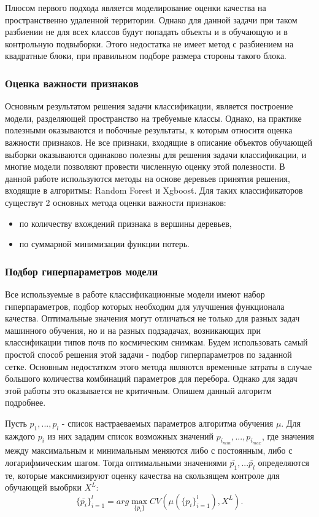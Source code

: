 \documentclass[14pt]{extarticle}
\begin{document}
Плюсом первого подхода является моделирование оценки качества на
пространственно удаленной территории. Однако для данной задачи при таком разбиении
не для всех классов будут попадать объекты и в обучающую и в контрольную подвыборки.
Этого недостатка не имеет метод с разбиением на квадратные блоки, при правильном
подборе размера стороны такого блока.
\par

\subsubsection{Оценка важности признаков}

\par
Основным результатом решения задачи классификации, является построение модели, разделяющей
пространство на требуемые классы. Однако, на практике полезными оказываются и побочные результаты,
к которым относитя оценка важности признаков. Не все признаки, входящие в описание объектов
обучающей выборки оказываются одинаково полезны для решения задачи классификации, и многие
модели позволяют провести численную оценку этой полезности. В данной работе используются методы
на основе деревьев принятия решения, входящие в алгоритмы: Random Forest и Xgboost. 
Для таких классификаторов существут 2 основных метода оценки важности признаков:
\begin{itemize}
    \item по количеству вхождений признака в вершины деревьев,
    \item по суммарной минимизации функции потерь.
\end{itemize}

\subsubsection{Подбор гиперпараметров модели}

\par
Все используемые в работе классификационные модели имеют набор гиперпараметров, подбор которых
необходим для улучшения функционала качества. Оптимальные значения могут отличаться не только
для разных задач машинного обучения, но и на разных подзадачах, возникающих при классификации
типов почв по космическим снимкам. Будем использовать самый простой способ решения этой задачи - 
подбор гиперпараметров по заданной сетке. Основным недостатком этого метода являются
временные затраты в случае большого количества комбинаций параметров для перебора.
Однако для задач этой работы это оказывается не критичным. Опишем данный алгоритм подробнее.
\par
Пусть $p_1, ..., p_l$ - список настраеваемых параметров алгоритма обучения $\mu$.
Для каждого $p_i$ из них зададим список возможных значений $p_{i_{min}}, ..., p_{i_{max}}$,
где значения между максимальным и минимальным меняются либо с постоянным,
либо с логарифмическим шагом. Тогда оптимальными значениями $\bar{p_1}, ... \bar{p_l}$
определяются те, которые максимизируют оценку качества на скользящем контроле для
обучающей выобрки $X^L$:
\[
    \{\bar{p_i}\}_{i=1}^l=arg\max_{\{p_i\}} CV(\mu(\{p_i\}_{i=1}^l), X^L).
\]
\end{document}
